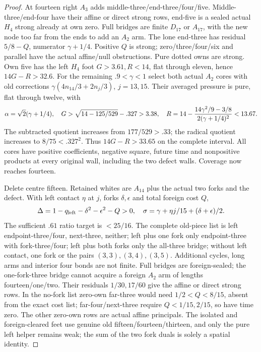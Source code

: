 \begin{proof}
At fourteen right $A_3$ adds middle-three/end-three/four/five.
Middle-three/end-four have their affine or direct strong rows,
end-five is a sealed actual $H_4$ strong already at own zero.
Full bridges are finite $D_{17}$ or $A_{17}$, with the new
node too far from the ends to add an $A_2$ arm.
The lone end-three has residual $5/8-Q$, numerator
$\gamma+1/4$. Positive $Q$ is strong; zero/three/four/six
and parallel have the actual affine/null obstructions.
Pure dotted owns are strong. Own five has the left $H_4$
foot $G>3.61,R<14$, flat through eleven, hence $14G-R>32.6$.
For the remaining $.9<\gamma<1$ select both actual $A_2$
cores with old corrections
$\gamma(4n_{14}/3+2n_j/3)$, $j=13,15$.
Their averaged pressure is pure, flat through twelve, with
\[
 \alpha=\sqrt2(\gamma+1/4),\quad
 G>\sqrt{14-125/529}-.327>3.38,\quad
 R=14-{14\gamma^2/9-3/8\over2(\gamma+1/4)^2}<13.67.
\]
The subtracted quotient increases from $177/529> .33$;
the radical quotient increases to $8/75<.327^2$.
Thus $14G-R>33.65$ on the complete interval.
All cores have positive coefficients, negative square, future
time and nonpositive products at every original wall, including
the two defect walls. Coverage now reaches fourteen.

Delete centre fifteen. Retained whites are $A_{14}$ plus
the actual two forks and the defect. With left contact $\eta$
at $j$, forks $\delta,\epsilon$ and total foreign cost $Q$,
\[
 \Delta=1-q_{\rm left}-\delta^2-\epsilon^2-Q>0,
 \quad\sigma=\gamma+\eta j/15+(\delta+\epsilon)/2.
\]
The sufficient $.61$ ratio target is $<25/16$.
The complete old-piece list is left endpoint-three/four,
next-three, neither; left plus one fork only endpoint-three
with fork-three/four; left plus both forks only the all-three
bridge; without left contact, one fork or the pairs
$(3,3),(3,4),(3,5)$. Additional cycles, long arms and interior
four bonds are not finite. Full bridges are foreign-sealed;
the one-fork-three bridge cannot acquire a foreign $A_2$ arm
of lengths fourteen/one/two. Their residuals $1/30,17/60$
give the affine or direct strong rows.
In the no-fork list zero-own far-three would need
$1/2<Q<8/15$, absent from the exact cost list;
far-four/next-three require $Q<1/15,2/15$, so have time zero.
The other zero-own rows are actual affine principals.
The isolated and foreign-cleared feet use genuine old
fifteen/fourteen/thirteen, and only the pure left helper remains
weak; the sum of the two fork duals is solely a spatial identity.


\end{proof}

